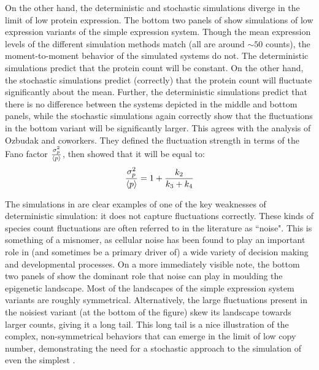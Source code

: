 On the other hand, the deterministic and stochastic simulations diverge in the limit of low protein expression. The bottom two panels of  show simulations of low expression variants of the simple expression system. Though the mean expression levels of the different simulation methods match (all are around ${\sim}50$ counts), the moment-to-moment behavior of the simulated systems do not. The deterministic simulations predict that the protein count will be constant. On the other hand, the stochastic simulations predict (correctly) that the protein count will fluctuate significantly about the mean. Further, the deterministic simulations predict that there is no difference between the systems depicted in the middle and bottom panels, while the stochastic simulations again correctly show that the fluctuations in the bottom variant will be significantly larger. This agrees with the analysis of Ozbudak and coworkers\supercite{Ozbudak:2002iq}. They defined the fluctuation strength in terms of the Fano factor $\frac{\sigma^{2}_{p}}{\left\langle p \right\rangle}$, then showed that it will be equal to:
\begin{equation}\label{eq:simple_expression_noise_strength}
    \frac{\sigma^{2}_{p}}{\left\langle p \right\rangle} = 1 + \frac{k_{2}}{k_{3} + k_{4}}
\end{equation}

The simulations in  are clear examples of one of the key weaknesses of deterministic simulation: it does not capture fluctuations correctly. These kinds of species count fluctuations are often referred to in the literature as ``noise"\supercite{Elowitz:2002hb}. This is something of a misnomer, as cellular noise has been found to play an important role in (and sometimes be a primary driver of\supercite{Jaruszewicz:2013fe,Ahrends:2014bm}) a wide variety of decision making\supercite{Andrews:2007gu,Balazsi:2011bw} and developmental processes\supercite{Pujadas:2012dj}. On a more immediately visible note, the bottom two panels of  show the dominant role that noise can play in moulding the epigenetic landscape. Most of the landscapes of the simple expression system variants are roughly symmetrical. Alternatively, the large fluctuations present in the noisiest variant (at the bottom of the figure) skew its landscape towards larger counts, giving it a long tail. This long tail is a nice illustration of the complex, non-symmetrical behaviors that can emerge in the limit of low copy number, demonstrating the need for a stochastic approach to the simulation of even the simplest .

